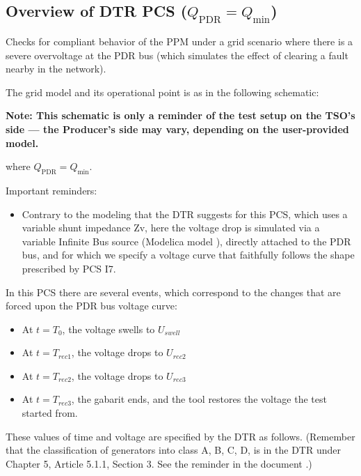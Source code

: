     \subsection{Overview of DTR PCS \DTRPcs{} ($Q_\text{PDR} = Q_\text{min}$)}

    Checks for compliant behavior of the PPM under a grid scenario where
    there is a severe overvoltage at the PDR bus (which simulates the
    effect of clearing a fault nearby in the network).

    The grid model and its operational point is as in the following schematic:
    \begin{center}
        
    \end{center}
    \begin{center}
        \small \textbf{Note: This schematic is only a reminder of the test setup on the TSO's
        side --- the Producer's side may vary, depending on the user-provided model.}
    \end{center}
    where $Q_\text{PDR} = Q_\text{min}$.

    \noindent Important reminders:
    \begin{itemize}
        \item Contrary to the modeling that the DTR suggests for this PCS, which uses a
        variable shunt impedance Zv, here the voltage drop is simulated via a variable
        Infinite Bus source (Modelica model ), directly
        attached to the PDR bus, and for which we specify a voltage curve that
        faithfully follows the shape prescribed by PCS I7.
    \end{itemize}

    In this PCS there are several events, which correspond to the changes that are
    forced upon the PDR bus voltage curve:
    \begin{itemize}
        \item At $t = T_{0}$, the voltage swells to $U_{swell}$
        \item At $t = T_{rec1}$, the voltage drops to $U_{rec2}$
        \item At $t = T_{rec2}$, the voltage drops to $U_{rec3}$
        \item At $t = T_{rec3}$, the gabarit ends, and the tool restores the
        voltage the test started from.
    \end{itemize}
    These values of time and voltage are specified by the DTR as follows. (Remember
    that the classification of generators into class A, B, C, D, is in the DTR under
    Chapter 5, Article 5.1.1, Section 3. See the reminder in the document
    .)

